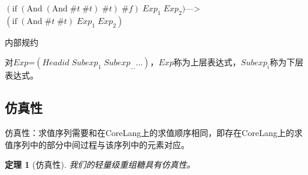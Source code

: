 $(\mbox{if}\; (\mbox{And}\; (\mbox{And}\; \#t\; \#t)\; \#t)\; \#f)\; Exp_{1}\; Exp_{2})$--->$(\mbox{if}\; (\mbox{And}\; \#t\; \#t)\; Exp_{1}\; Exp_{2})$ \begin{flushright}内部规约\end{flushright}

对$Exp$=$(Headid\;Subexp_{1}\;Subexp_{\ldots} \ldots)$，$Exp$称为上层表达式，$Subexp_{i}$称为下层表达式。

\subsection{仿真性}
仿真性：求值序列需要和在CoreLang上的求值顺序相同，即存在CoreLang上的求值序列中的部分中间过程与该序列中的元素对应。

\newtheorem{mythm}{定理}[section]
\begin{mythm}[仿真性]
	我们的轻量级重组糖具有仿真性。
\end{mythm}
